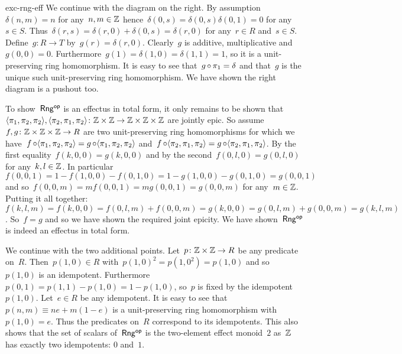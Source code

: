 \begin{solution}{exc-rng-eff}
We continue with the diagram on the right.
By assumption~$\delta(n,m) = n$ for any~$n,m \in \mathbb{Z}$
    hence~$\delta(0,s) = \delta(0,s)\delta(0,1) = 0$ for any~$s\in S$.
Thus~$\delta(r,s) = \delta(r,0) + \delta(0,s) = \delta(r,0)$
    for any~$r \in R$ and~$s \in S$.
Define~$g\colon R \to T$ by~$g(r) = \delta(r,0)$.
Clearly~$g$ is additive, multiplicative and~$g(0,0) = 0$.
Furthermore~$g(1) = \delta(1,0) = \delta(1,1) = 1$,
    so it is a unit-preserving ring homomorphism.
It is easy to see that~$g \mathop{\circ} \pi_1 = \delta$ and that~$g$
    is the unique such unit-preserving ring homomorphism.
We have shown the right diagram is a pushout too.

To show~${\mathsf{Rng}}{^{\mathsf{op}}}$ is an effectus in total form,
    it only remains to be shown that~$
        \langle \pi_1, \pi_2,\pi_2\rangle,
        \langle \pi_2, \pi_1,\pi_2\rangle
        \colon \mathbb{Z}\times\mathbb{Z}
            \to \mathbb{Z}\times\mathbb{Z}\times\mathbb{Z}$ are jointly epic.
    So assume~$f,g\colon \mathbb{Z}\times\mathbb{Z}\times\mathbb{Z} \to R$
        are two unit-preserving ring homomorphisms
        for which we have~$f \mathop{\circ} \langle \pi_1, \pi_2,\pi_2\rangle  =
        g \mathop{\circ} \langle \pi_1, \pi_2,\pi_2\rangle$
        and~$f \mathop{\circ} \langle \pi_2, \pi_1,\pi_2\rangle =
        g \mathop{\circ} \langle \pi_2, \pi_1,\pi_2\rangle$.
    By the first equality~$f(k,0,0) = g(k,0,0)$
        and by the second~$f(0,l,0) = g(0,l,0)$
            for any~$k,l \in \mathbb{Z}$.
In particular~$f(0,0,1) = 1-f(1,0,0) - f(0,1,0)
    = 1 - g(1,0,0) - g(0,1,0) = g(0,0,1)$
        and so~$f(0,0,m) = m f(0,0,1) = m g(0,0,1) = g(0,0,m)$
            for any~$m \in \mathbb{Z}$.
    Putting it all together: $f(k,l,m) 
            = f(k,0,0) = f(0,l,m) + f(0,0,m)
            = g(k,0,0) = g(0,l,m) + g(0,0,m) = g(k,l,m)$.
    So~$f=g$ and so we have shown the required joint epicity.
We have shown~${\mathsf{Rng}}{^{\mathsf{op}}}$ is indeed an effectus in total form.

We continue with the two additional points.
Let~$p \colon \mathbb{Z}\times\mathbb{Z} \to R$ be any predicate on~$R$.
Then~$p(1,0) \in R$ with~$p(1,0)^2 = p(1,0^2) = p(1,0)$ and so~$p(1,0)$
    is an idempotent.
    Furthermore~$p(0,1) = p(1,1) - p(1,0) = 1 - p(1,0)$,
        so~$p$ is fixed by the idempotent~$p(1,0)$.
Let~$e \in R$ be any idempotent.
It is easy to see that~$p(n,m) \equiv ne + m(1-e)$ is a unit-preserving
    ring homomorphism with~$p(1,0) = e$.  Thus the predicates
        on~$R$ correspond to its idempotents.
    This also shows that the set of scalars of~${\mathsf{Rng}}{^{\mathsf{op}}}$
        is the two-element effect monoid~$2$
        as~$\mathbb{Z}$ has exactly two idempotents: $0$ and~$1$.


\end{solution}
